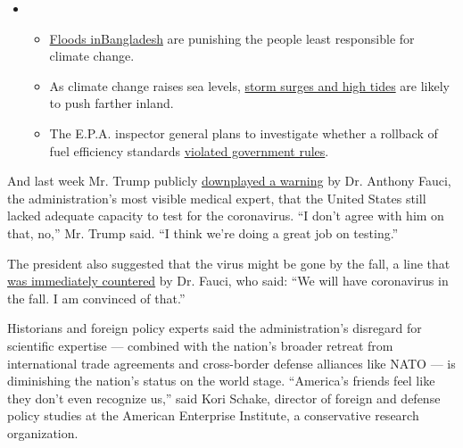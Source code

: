 \begin{itemize}
\item
  \begin{itemize}
  \tightlist
  \item
    \href{https://www.nytimes3xbfgragh.onion/2020/07/30/climate/bangladesh-floods.html?action=click\&pgtype=Article\&state=default\&region=MAIN_CONTENT_1\&context=storylines_keepup}{Floods
    in}\href{https://www.nytimes3xbfgragh.onion/2020/07/30/climate/bangladesh-floods.html?action=click\&pgtype=Article\&state=default\&region=MAIN_CONTENT_1\&context=storylines_keepup}{Bangladesh}
    are punishing the people least responsible for climate change.
  \item
    As climate change raises sea levels,
    \href{https://www.nytimes3xbfgragh.onion/2020/07/30/climate/sea-level-inland-floods.html?action=click\&pgtype=Article\&state=default\&region=MAIN_CONTENT_1\&context=storylines_keepup}{storm
    surges and high tides} are likely to push farther inland.
  \item
    The E.P.A. inspector general plans to investigate whether a rollback
    of fuel efficiency standards
    \href{https://www.nytimes3xbfgragh.onion/2020/07/27/climate/trump-fuel-efficiency-rule.html?action=click\&pgtype=Article\&state=default\&region=MAIN_CONTENT_1\&context=storylines_keepup}{violated
    government rules}.
  \end{itemize}
\end{itemize}

And last week Mr. Trump publicly
\href{https://www.cnn.com/2020/04/23/politics/fauci-testing-capacity-not-overly-confident/index.html}{downplayed
a warning} by Dr. Anthony Fauci, the administration's most visible
medical expert, that the United States still lacked adequate capacity to
test for the coronavirus. ``I don't agree with him on that, no,'' Mr.
Trump said. ``I think we're doing a great job on testing.''

The president also suggested that the virus might be gone by the fall, a
line that
\href{https://www.nytimes3xbfgragh.onion/2020/04/22/us/politics/trump-coronavirus-fall.html}{was
immediately countered} by Dr. Fauci, who said: ``We will have
coronavirus in the fall. I am convinced of that.''

Historians and foreign policy experts said the administration's
disregard for scientific expertise --- combined with the nation's
broader retreat from international trade agreements and cross-border
defense alliances like NATO --- is diminishing the nation's status on
the world stage. ``America's friends feel like they don't even recognize
us,'' said Kori Schake, director of foreign and defense policy studies
at the American Enterprise Institute, a conservative research
organization.

